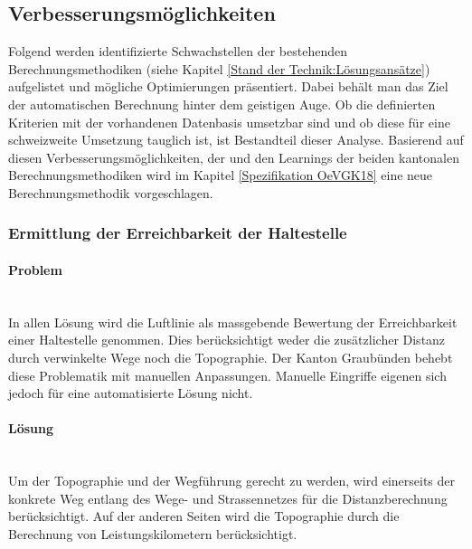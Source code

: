 \subsection{Verbesserungsmöglichkeiten}
\label{Stand der Technik:Verbesserungsmöglichkeiten und Zusammenhang zu bestehenden Lösungen}

Folgend werden identifizierte Schwachstellen der bestehenden Berechnungsmethodiken (siehe Kapitel \ref{Stand der Technik:Lösungsansätze}) aufgelistet und mögliche Optimierungen präsentiert.
Dabei behält man das Ziel der automatischen Berechnung hinter dem geistigen Auge.
Ob die definierten Kriterien mit der vorhandenen Datenbasis umsetzbar sind und ob diese für eine schweizweite Umsetzung tauglich ist, ist Bestandteil dieser Analyse.
Basierend auf diesen Verbesserungsmöglichkeiten, der  und den Learnings der beiden kantonalen Berechnungsmethodiken wird im Kapitel \ref{Spezifikation OeVGK18} eine neue Berechnungsmethodik vorgeschlagen.

\subsubsection{Ermittlung der Erreichbarkeit der Haltestelle}
\label{Verbesserungsmöglichkeiten:Ermittlung der Erreichbarkeit der Haltestelle}

\paragraph{Problem}~\\
In allen Lösung wird die Luftlinie als massgebende Bewertung der Erreichbarkeit einer Haltestelle genommen.
Dies berücksichtigt weder die zusätzlicher Distanz durch verwinkelte Wege noch die Topographie.
Der Kanton Graubünden behebt diese Problematik mit manuellen Anpassungen.
Manuelle Eingriffe eigenen sich jedoch für eine automatisierte Lösung nicht.

\paragraph{Lösung}~\\
Um der Topographie und der Wegführung gerecht zu werden, wird einerseits der konkrete Weg entlang des Wege- und Strassennetzes für die Distanzberechnung berücksichtigt.
Auf der anderen Seiten wird die Topographie durch die Berechnung von \gls{Leistungskilometer}n berücksichtigt.

